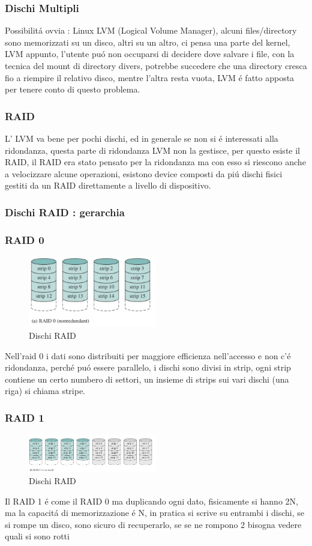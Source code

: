 \subsubsection*{Dischi Multipli}
Possibilitá ovvia : Linux LVM (Logical Volume Manager), alcuni files/directory sono memorizzati su un disco, altri su un altro,
ci pensa una parte del kernel, LVM appunto, l'utente puó non occuparsi di decidere dove salvare i file, con la tecnica del mount
di directory divers, potrebbe succedere che una directory cresca fio a riempire il relativo disco, mentre l'altra resta vuota,
LVM é fatto apposta per tenere conto di questo problema.
\subsubsection*{RAID}
L' LVM va bene per pochi dischi, ed in generale se non si é interessati alla ridondanza, questa parte di ridondanza LVM
non la gestisce, per questo esiste il RAID, il RAID era stato pensato per la ridondanza ma con esso si riescono anche a velocizzare
alcune operazioni, esistono device composti da piú dischi fisici gestiti da un RAID direttamente a livello di dispositivo.
\subsubsection*{Dischi RAID : gerarchia}
\subsubsection*{RAID 0}
\begin{figure}[H]
    \centering
    \includegraphics[width=0.5\textwidth]{immagini/RAID0}
    \caption{Dischi RAID}
\end{figure}
Nell'raid 0 i dati sono distribuiti per maggiore efficienza nell'accesso e non c'é ridondanza, perché puó essere parallelo, i dischi sono divisi
in strip, ogni strip contiene un certo numbero di settori, un insieme di strips sui vari dischi (una riga) si chiama stripe.
\subsubsection*{RAID 1}
\begin{figure}[H]
    \centering
    \includegraphics[width=0.5\textwidth]{immagini/RAID1}
    \caption{Dischi RAID}
\end{figure}
Il RAID 1 é come il RAID 0 ma duplicando ogni dato, fisicamente si hanno 2N, ma la
capacitá di memorizzazione é N, in pratica si scrive su entrambi i dischi, se si rompe un disco, sono sicuro di recuperarlo,
se se ne rompono 2 bisogna vedere quali si sono rotti
